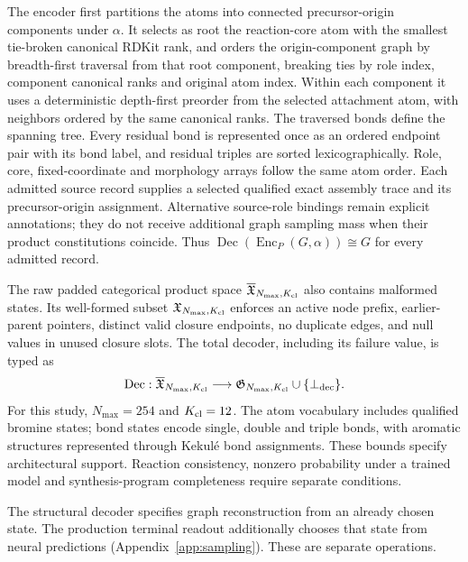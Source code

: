 The encoder first partitions the atoms into connected precursor-origin components under $\alpha$.
It selects as root the reaction-core atom with the smallest tie-broken canonical RDKit rank, and
orders the origin-component graph by breadth-first traversal from that root component, breaking
ties by role index, component canonical ranks and original atom index. Within each component it uses
a deterministic depth-first preorder from the selected attachment atom, with neighbors ordered by
the same canonical ranks. The traversed bonds define the spanning tree. Every residual bond is
represented once as an ordered endpoint pair with its bond label, and residual triples are sorted
lexicographically. Role, core, fixed-coordinate and morphology arrays follow the
same atom order. Each admitted source record supplies a selected qualified exact assembly trace
and its precursor-origin assignment. Alternative source-role bindings remain explicit annotations;
they do not receive additional graph sampling mass when their product constitutions coincide. Thus
$\operatorname{Dec}(\operatorname{Enc}_P(G,\alpha))\cong G$ for every admitted record.

The raw padded categorical product space $\overline{\mathfrak X}_{N_{\max},K_{\rm cl}}$ also
contains malformed states. Its well-formed subset $\mathfrak X_{N_{\max},K_{\rm cl}}$ enforces an
active node prefix, earlier-parent pointers, distinct valid closure endpoints, no duplicate edges,
and null values in unused closure slots. The total decoder, including its failure value, is typed as
\begin{equation}
    \operatorname{Dec}:\overline{\mathfrak X}_{N_{\max},K_{\rm cl}}
    \longrightarrow
    \mathfrak G_{N_{\max},K_{\rm cl}}\cup\{\bot_{\rm dec}\}.
\end{equation}
For this study, $N_{\max}=254$ and $K_{\rm cl}=12$. The atom vocabulary includes qualified bromine states; bond states encode single, double and triple bonds, with aromatic structures represented through Kekul\'e bond assignments.
These bounds specify architectural support. Reaction consistency, nonzero probability under a
trained model and synthesis-program completeness require separate conditions.

The structural decoder specifies graph reconstruction from an already chosen state.
The production terminal readout additionally chooses that state from neural predictions
(Appendix~\ref{app:sampling}). These are separate operations.

